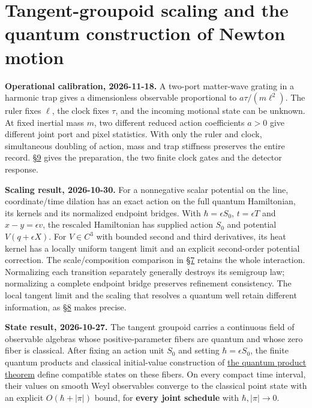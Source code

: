 \documentclass[11pt,a4paper]{article}
\begin{document}
\section{Tangent-groupoid scaling and the quantum construction of Newton
motion}\label{tangent-groupoid-scaling-and-the-quantum-construction-of-newton-motion}

\textbf{Operational calibration, 2026-11-18.} A two-port matter-wave
grating in a harmonic trap gives a dimensionless observable proportional
to \(a\tau/(m\ell^2)\). The ruler fixes \(\ell\), the clock fixes
\(\tau\), and the incoming motional state can be unknown. At fixed
inertial mass \(m\), two different reduced action coefficients \(a>0\)
give different joint port and pixel statistics. With only the ruler and
clock, simultaneous doubling of action, mass and trap stiffness
preserves the entire record.
\hyperref[9-action-calibration-with-a-clocked-grating]{§9} gives the
preparation, the two finite clock gates and the detector response.

\textbf{Scaling result, 2026-10-30.} For a nonnegative scalar potential
on the line, coordinate/time dilation has an exact action on the full
quantum Hamiltonian, its kernels and its normalized endpoint bridges.
With \(\hbar=\epsilon S_0\), \(t=\epsilon T\) and \(x-y=\epsilon v\),
the rescaled Hamiltonian has supplied action \(S_0\) and potential
\(V(q+\epsilon X)\). For \(V\in C^3\) with bounded second and third
derivatives, its heat kernel has a locally uniform tangent limit and an
explicit second-order potential correction. The scale/composition
comparison in \hyperref[7-interacting-kernels-under-tangent-scaling]{§7}
retains the whole interaction. Normalizing each transition separately
generally destroys its semigroup law; normalizing a complete endpoint
bridge preserves refinement consistency. The local tangent limit and the
scaling that resolves a quantum well retain different information, as
\hyperref[8-which-zoom-resolves-a-quantum-well]{§8} makes precise.

\textbf{State result, 2026-10-27.} The tangent groupoid carries a
continuous field of observable algebras whose positive-parameter fibers
are quantum and whose zero fiber is classical. After fixing an action
unit \(S_0\) and setting \(\hbar=\epsilon S_0\), the finite quantum
products and classical initial-value construction of
\href{quantum-blocks-construct-newton.md}{the quantum product theorem}
define compatible states on these fibers. On every compact time
interval, their values on smooth Weyl observables converge to the
classical point state with an explicit \(O(\hbar+|\pi|)\) bound, for
\textbf{every joint schedule} with \(\hbar,|\pi|\to0\).
\end{document}
